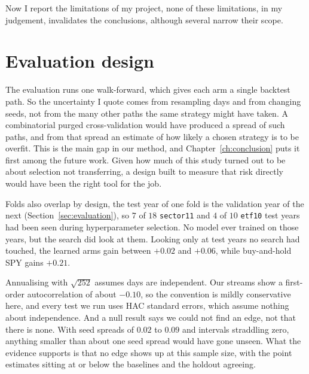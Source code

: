 
Now I report the limitations of my project, none of these limitations, in my judgement, invalidates the conclusions, although several narrow their scope.

\section{Evaluation design}
\label{sec:lim-evaluation}

The evaluation runs one walk-forward, which gives each arm a single backtest path. So the uncertainty I quote comes from resampling days and from changing seeds, not from the many other paths the same strategy might have taken. A combinatorial purged cross-validation would have produced a spread of such paths, and from that spread an estimate of how likely a chosen strategy is to be overfit. This is the main gap in our method, and Chapter~\ref{ch:conclusion} puts it first among the future work. Given how much of this study turned out to be about selection not transferring, a design built to measure that risk directly would have been the right tool for the job.

Folds also overlap by design, the test year of one fold is the validation year of the next (Section~\ref{sec:evaluation}), so $7$ of $18$ \texttt{sector11} and $4$ of $10$ \texttt{etf10} test years had been seen during hyperparameter selection. No model ever trained on those years, but the search did look at them. Looking only at test years no search had touched, the learned arms gain between $+0.02$ and $+0.06$, while buy-and-hold SPY gains $+0.21$. 

Annualising with $\sqrt{252}$ assumes days are independent. Our streams show a first-order autocorrelation of about $-0.10$, so the convention is mildly conservative here, and every test we run uses HAC standard errors, which assume nothing about independence. And a null result says we could not find an edge, not that there is none. With seed spreads of $0.02$ to $0.09$ and intervals straddling zero, anything smaller than about one seed spread would have gone unseen. What the evidence supports is that no edge shows up at this sample size, with the point estimates sitting at or below the baselines and the holdout agreeing.

